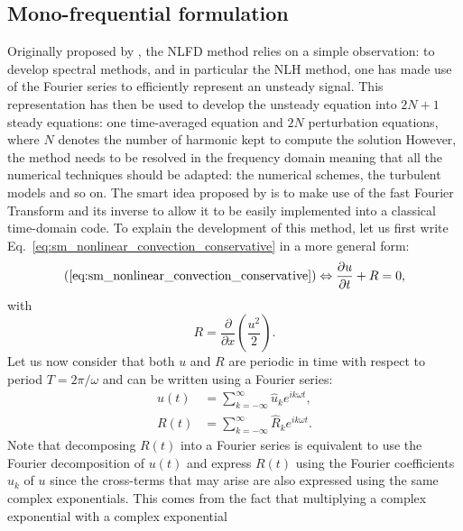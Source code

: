 
\subsection{Mono-frequential formulation}

Originally proposed by \citet{McMullen2001}, the NLFD
method relies on a simple observation: to develop spectral methods, and in
particular the NLH method, one has made use of the Fourier
series to efficiently represent an unsteady signal.
This representation has then be used to develop the unsteady
equation into $2N+1$ steady equations: one time-averaged equation
and $2N$ perturbation equations, 
where $N$ denotes the number
of harmonic kept to compute the solution
However, the method needs to be resolved in the frequency domain meaning
that all the numerical techniques should be adapted: the numerical schemes,
the turbulent models and so on. The smart idea 
proposed by \citet{McMullen2001} is to
make use of the fast Fourier Transform and its inverse to
allow it to be easily implemented into a classical time-domain code.
To explain the development of this method, let us first 
write Eq.~\eqref{eq:sm_nonlinear_convection_conservative} 
in a more general form:
\begin{equation}
	(\ref{eq:sm_nonlinear_convection_conservative})
	\Leftrightarrow
	\frac{\partial u}{\partial t} + R = 0,
	\label{eq:sm_nonlinear_convection_residual}
\end{equation}
with
\begin{equation}
	R = \frac{\partial}{\partial x} \left( 
	\frac{u^2}{2} \right).
\end{equation}
Let us now consider that both $u$ and $R$ are periodic
in time with respect to period $T = 2 \pi / \omega$
and can be written using a Fourier series:
\begin{equation}
	\begin{split}
		u(t) &= \sum_{k=-\infty}^{\infty} \widehat{u}_k e^{i k \omega t}, \\
		R(t) &= \sum_{k=-\infty}^{\infty} \widehat{R}_k e^{i k \omega t}.
	\end{split}
\end{equation}
Note that decomposing $R(t)$ into a Fourier series is equivalent
to use the Fourier decomposition of $u(t)$ and express
$R(t)$ using the Fourier coefficients $\widehat{u}_k$ of $u$
since the cross-terms that may arise are also expressed 
using the same complex exponentials. This comes from the fact
that multiplying a complex exponential with a complex exponential
